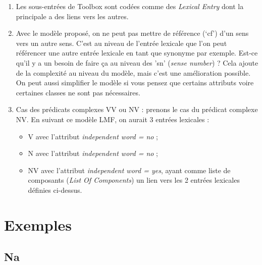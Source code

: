 \documentclass[a4paper,12pt]{article}
\begin{document}
\begin{enumerate}
\item Les sous-entr\'ees de Toolbox sont cod\'ees comme des \textit{Lexical Entry} dont la principale a des liens vers les autres.
\item Avec le mod\`ele propos\'e, on ne peut pas mettre de r\'ef\'erence (`cf') d'un sens vers un autre sens. C'est au niveau de l'entr\'ee lexicale que l'on peut r\'ef\'erencer une autre entr\'ee lexicale en tant que synonyme par exemple. Est-ce qu'il y a un besoin de faire ça au niveau des 'sn' (\textit{sense number}) ? Cela ajoute de la complexit\'e au niveau du mod\`ele, mais c'est une am\'elioration possible. On peut aussi simplifier le mod\`ele si vous pensez que certains attributs voire certaines classes ne sont pas n\'ecessaires.
\item Cas des pr\'edicats complexes VV ou NV : prenons le cas du pr\'edicat complexe NV. En suivant ce mod\`ele LMF, on aurait 3 entr\'ees lexicales :
\begin{itemize}
\item V avec l'attribut \textit{independent word = no} ;
\item N avec l'attribut \textit{independent word = no} ;
\item NV avec l'attribut \textit{independent word = yes}, ayant comme liste de composants (\textit{List Of Components}) un lien vers les 2 entr\'ees lexicales d\'efinies ci-dessus.
\end{itemize}
\end{enumerate}

\pagebreak

\section{Exemples}

\subsection{Na}
\end{document}

